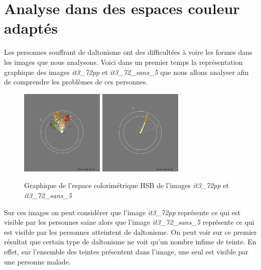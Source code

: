 \documentclass[a4paper,10pt]{article}
\begin{document}
\section{Analyse dans des espaces couleur adaptés}
Les personnes souffrant de daltonisme ont des difficultées à voire les formes dans les images que nous analysons. 
Voici dans un premier temps la représentation graphique des images \textit{it3\_72pp} et \textit{it3\_72\_sans\_5} que nous
allons analyser afin de comprendre les problèmes de ces personnes.
\begin{figure}[!h]
 \begin{center}
 \includegraphics[width=4cm]{resultat/compare1_1.png}
 \includegraphics[width=4cm]{resultat/compare1_2.png}
 \caption{Graphique de l'espace colorimétrique HSB de l'images \textit{it3\_72pp} et \textit{it3\_72\_sans\_5}}
 \end{center}
\end{figure}

Sur ces images on peut considérer que l'image \textit{it3\_72pp} représente ce qui est visible par les personnes saine alors
que l'image \textit{it3\_72\_sans\_5} représente ce qui est visible par les personnes atteintent de daltonisme.
On peut voir sur ce premier résultat que certain type de daltonisme ne voit qu'un nombre infime de teinte. En effet, sur 
l'ensemble des teintes présentent dans l'image, une seul est visible par une personne malade.
\end{document}
